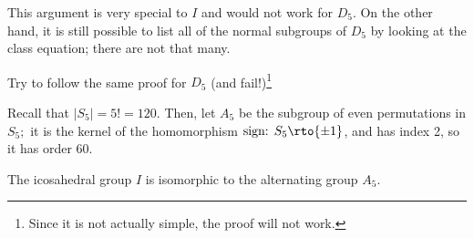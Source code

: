 This argument is very special to $I$ and would not work for $D_5.$ On the other hand, it is still possible to list all of the normal subgroups of $D_5$ by looking at the class equation; there are not that many.

\begin{problem}
Try to follow the same proof for $D_5$ (and fail!)\footnote{Since it is not actually simple, the proof will not work.}
\end{problem}

Recall that $|S_5| = 5! = 120.$ Then, let $A_5$ be the subgroup of even permutations in $S_5;$ it is the kernel of the homomorphism  $\text{sign: } S_5 \rto \{\pm 1\}$, and has index 2, so it has order 60. 

\begin{theorem}
The icosahedral group $I$ is isomorphic to the alternating group $A_5.$ 
\end{theorem}

